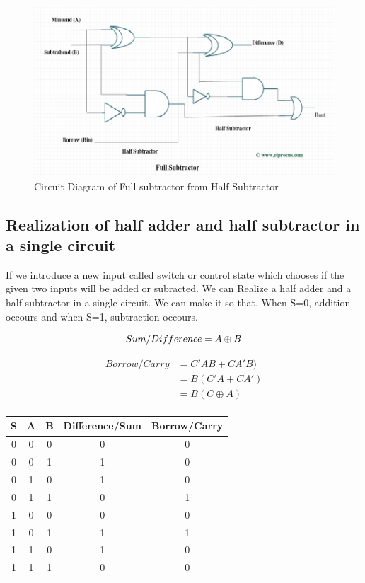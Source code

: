 \documentclass[a4paper, 12pt]{article}
\begin{document}
\begin{figure}[h]
	\centering
	\includegraphics[scale=0.6]{full-sub-from-half-sub-circuit.jpg}
	\caption{Circuit Diagram of Full subtractor from Half Subtractor}
\end{figure}

\pagebreak

\subsection{Realization of half adder and half subtractor in a single circuit}
If we introduce a new input called switch or control state which chooses if the given two inputs will be added or subracted. We can Realize
a half adder and a half subtractor in a single circuit. We can make it so that, When S=0, addition occours and when S=1, subtraction occours.

\begin{equation}
	Sum/Difference = A \oplus B \\
\end{equation}

\begin{equation}
\begin{split}
	Borrow/Carry &= C'AB + CA'B) \\
							 &= B(C'A + CA') \\
							 &= B(C \oplus A) \\
\end{split}
\end{equation}

\begin{center}
	\begin{tabular}[h]{|c|c|c|c|c|}
	\hline
	S & A & B & Difference/Sum & Borrow/Carry \\
	\hline
	0 & 0 & 0 & 0 & 0 \\
	0 & 0 & 1 & 1 & 0 \\
	0 & 1 & 0 & 1 & 0 \\
	0 & 1 & 1 & 0 & 1 \\
	1 & 0 & 0 & 0 & 0 \\
	1 & 0 & 1 & 1 & 1 \\
	1 & 1 & 0 & 1 & 0 \\
	1 & 1 & 1 & 0 & 0 \\
	\hline
	\end{tabular}
\end{center}
\end{document}
